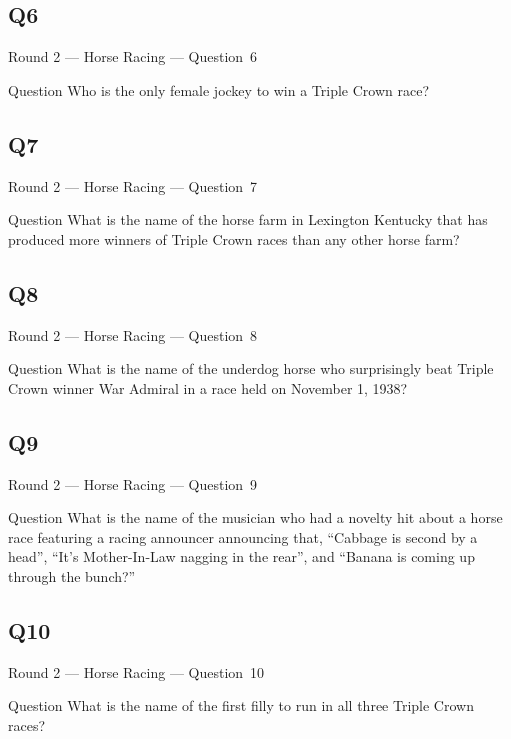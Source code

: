 \documentclass[11pt]{beamer}
\begin{document}
\subsection*{Q6}
\begin{frame}[t]{Round 2 --- Horse Racing --- \mbox{Question 6}}
\vspace{-0.5em}
\begin{block}{Question}
Who is the only female jockey to win a Triple Crown race?
\end{block}
\end{frame}
\subsection*{Q7}
\begin{frame}[t]{Round 2 --- Horse Racing --- \mbox{Question 7}}
\vspace{-0.5em}
\begin{block}{Question}
What is the name of the horse farm in Lexington Kentucky that has produced more winners of Triple Crown races than any other horse farm?
\end{block}
\end{frame}
\subsection*{Q8}
\begin{frame}[t]{Round 2 --- Horse Racing --- \mbox{Question 8}}
\vspace{-0.5em}
\begin{block}{Question}
What is the name of the underdog horse who surprisingly beat Triple Crown winner War Admiral in a race held on November 1, 1938?
\end{block}
\end{frame}
\subsection*{Q9}
\begin{frame}[t]{Round 2 --- Horse Racing --- \mbox{Question 9}}
\vspace{-0.5em}
\begin{block}{Question}
What is the name of the musician who had a novelty hit about a horse race featuring a racing announcer announcing that, ``Cabbage is second by a head'', ``It's Mother-In-Law nagging in the rear'', and ``Banana is coming up through the bunch?''
\end{block}
\end{frame}
\subsection*{Q10}
\begin{frame}[t]{Round 2 --- Horse Racing --- \mbox{Question 10}}
\vspace{-0.5em}
\begin{block}{Question}
What is the name of the first filly to run in all three Triple Crown races?

\end{block}
\end{frame}
\end{document}
